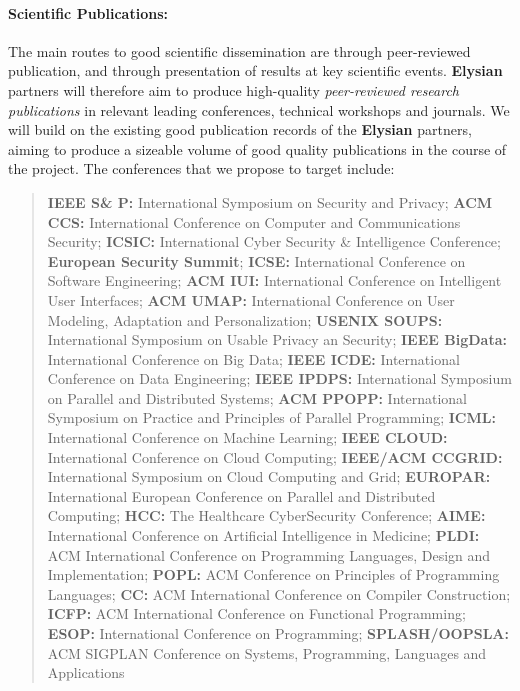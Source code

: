 \documentclass[a4paper,11pt]{article}
\newcommand{\project}[1]{\textbf{#1}\xspace}
\newcommand{\SECURITY}{\project{Elysian}}
\newcommand{\TheProject}{\SECURITY}
\begin{document}
\paragraph{Scientific Publications:}  The main routes to good scientific dissemination are
through peer-reviewed publication, and through presentation of results at key scientific events.
\TheProject{} partners will therefore aim to produce high-quality \emph{peer-reviewed
research publications} in relevant leading
conferences, technical workshops and journals.
We will build on the existing good publication records of the \TheProject{} partners,
aiming to produce a sizeable volume of good quality publications in the course of the project. 
%
\noindent
The conferences that we propose to target include:

\begin{quote}
\textbf{IEEE S\& P:} International Symposium on Security and Privacy;
\textbf{ACM CCS:} International Conference on Computer and Communications Security;
\textbf{ICSIC:} International Cyber Security \& Intelligence Conference;
\textbf{European Security Summit};
\textbf{ICSE:} International Conference on Software Engineering;
\textbf{ACM IUI:} International Conference on Intelligent User Interfaces;
\textbf{ACM UMAP:} International Conference on User Modeling, Adaptation and Personalization;
\textbf{USENIX SOUPS:} International Symposium on Usable Privacy an Security;
\textbf{IEEE BigData:} International Conference on Big Data;
\textbf{IEEE ICDE:} International Conference on Data Engineering;
\textbf{IEEE IPDPS:} International Symposium on Parallel and Distributed Systems;
\textbf{ACM PPOPP:} International Symposium on Practice and Principles of Parallel Programming;
\textbf{ICML:} International Conference on Machine Learning;
\textbf{IEEE CLOUD:} International Conference on Cloud Computing;
\textbf{IEEE/ACM CCGRID:} International Symposium on Cloud Computing and Grid;
\textbf{EUROPAR:} International European Conference on Parallel and Distributed Computing; 
\textbf{HCC:} The Healthcare CyberSecurity Conference;
\textbf{AIME:} International Conference on Artificial Intelligence in Medicine;
\textbf{PLDI: } ACM International Conference on Programming Languages, Design and Implementation;
\textbf{POPL: } ACM Conference on Principles of Programming Languages;
\textbf{CC: } ACM International Conference on Compiler Construction;
\textbf{ICFP: } ACM International Conference on Functional Programming;
\textbf{ESOP: } International Conference on Programming;
\textbf{SPLASH/OOPSLA: } ACM SIGPLAN Conference on Systems, Programming, Languages and Applications

\end{quote}
\end{document}
